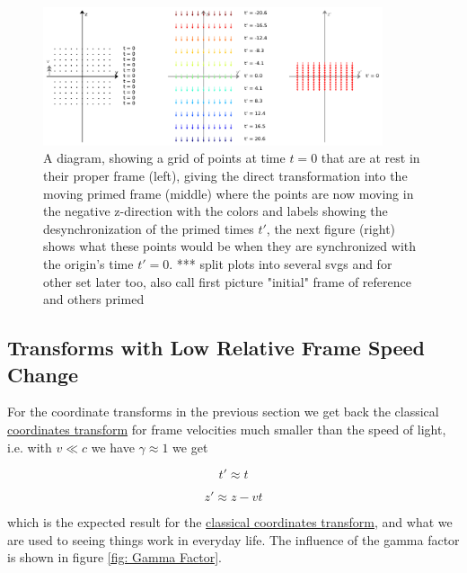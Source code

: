 \begin{figure}[H]
	\centering
	\includegraphics[width=10cm]{images/pdf/coordinate_transforms.pdf}
	\caption{A diagram, showing a grid of points at time $t=0$ that are at rest in their proper frame (left), giving the direct transformation into the moving primed frame (middle) where the points are now moving in the negative z-direction with the colors and labels showing the desynchronization of the primed times $t'$, the next figure (right) shows what these points would be when they are synchronized with the origin's time $t'=0$. *** split plots into several svgs and for other set later too, also call first picture "initial" frame of reference and others primed}
	\label{fig: coordinate transform}
\end{figure}

\subsection{Transforms with Low Relative Frame Speed Change}

For the coordinate transforms in the previous section we get back the classical \hyperlink{def-galilean-transform}{coordinates transform} for frame velocities much smaller than the speed of light, i.e. with $v\ll c$ we have $\gamma \approx 1$ we get

\begin{equation}
	t' \approx t
\end{equation}

\begin{equation}
	z{'} \approx z - vt
\end{equation}

which is the expected result for the \hyperlink{def-galilean-transform}{classical coordinates transform}, and what we are used to seeing things work in everyday life. The influence of the gamma factor is shown in figure \ref{fig: Gamma Factor}.

